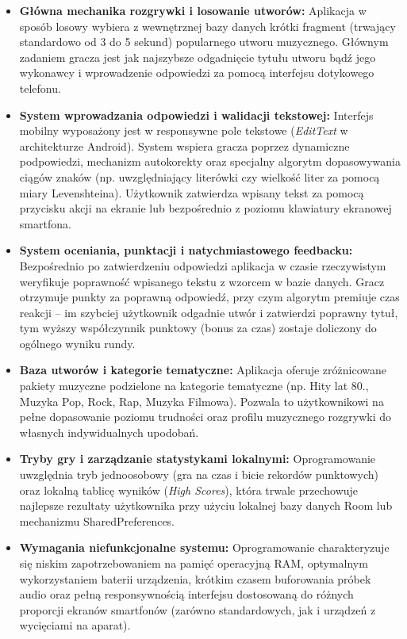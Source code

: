 \begin{itemize}
    \item \textbf{Główna mechanika rozgrywki i losowanie utworów:} 
    Aplikacja w sposób losowy wybiera z wewnętrznej bazy danych krótki fragment (trwający standardowo od 3 do 5 sekund) popularnego utworu muzycznego. Głównym zadaniem gracza jest jak najszybsze odgadnięcie tytułu utworu bądź jego wykonawcy i wprowadzenie odpowiedzi za pomocą interfejsu dotykowego telefonu.
    
    \item \textbf{System wprowadzania odpowiedzi i walidacji tekstowej:} 
    Interfejs mobilny wyposażony jest w responsywne pole tekstowe (\textit{EditText} w architekturze Android). System wspiera gracza poprzez dynamiczne podpowiedzi, mechanizm autokorekty oraz specjalny algorytm dopasowywania ciągów znaków (np. uwzględniający literówki czy wielkość liter za pomocą miary Levenshteina). Użytkownik zatwierdza wpisany tekst za pomocą przycisku akcji na ekranie lub bezpośrednio z poziomu klawiatury ekranowej smartfona.
    
    \item \textbf{System oceniania, punktacji i natychmiastowego feedbacku:} 
    Bezpośrednio po zatwierdzeniu odpowiedzi aplikacja w czasie rzeczywistym weryfikuje poprawność wpisanego tekstu z wzorcem w bazie danych. Gracz otrzymuje punkty za poprawną odpowiedź, przy czym algorytm premiuje czas reakcji – im szybciej użytkownik odgadnie utwór i zatwierdzi poprawny tytuł, tym wyższy współczynnik punktowy (bonus za czas) zostaje doliczony do ogólnego wyniku rundy.
    
    \item \textbf{Baza utworów i kategorie tematyczne:} 
    Aplikacja oferuje zróżnicowane pakiety muzyczne podzielone na kategorie tematyczne (np. Hity lat 80., Muzyka Pop, Rock, Rap, Muzyka Filmowa). Pozwala to użytkownikowi na pełne dopasowanie poziomu trudności oraz profilu muzycznego rozgrywki do własnych indywidualnych upodobań.
    
    \item \textbf{Tryby gry i zarządzanie statystykami lokalnymi:} 
    Oprogramowanie uwzględnia tryb jednoosobowy (gra na czas i bicie rekordów punktowych) oraz lokalną tablicę wyników (\textit{High Scores}), która trwale przechowuje najlepsze rezultaty użytkownika przy użyciu lokalnej bazy danych Room lub mechanizmu SharedPreferences.
    
    \item \textbf{Wymagania niefunkcjonalne systemu:} 
    Oprogramowanie charakteryzuje się niskim zapotrzebowaniem na pamięć operacyjną RAM, optymalnym wykorzystaniem baterii urządzenia, krótkim czasem buforowania próbek audio oraz pełną responsywnością interfejsu dostosowaną do różnych proporcji ekranów smartfonów (zarówno standardowych, jak i urządzeń z wycięciami na aparat).
\end{itemize}

